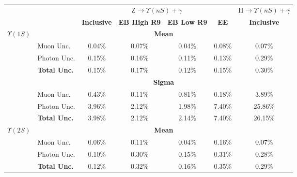 
\begin{tabular}{cl|c|c|c|c|c|}
\cline{3-7}
\multicolumn{1}{l}{}                      &      & \multicolumn{4}{c|}{Z$\rightarrow \Upsilon(nS) + \gamma$} & H$\rightarrow \Upsilon(nS) + \gamma$ \\ \cline{3-7}
\multicolumn{1}{l}{}                      &                     & \textbf{Inclusive}  & \textbf{EB High R9}  & \textbf{EB Low R9}  & \textbf{EE} & \textbf{Inclusive}        \\ \hline


\multicolumn{1}{|c|}{\multirow{8}{*}{$\Upsilon(1S)$}} & \multicolumn{6}{c|}{\textbf{Mean}} \\ \cline{2-7}
\multicolumn{1}{|c|}{}                    & Muon Unc.           & 0.04\% & 0.07\% & 0.04\% & 0.08\% & 0.07\% \\ \cline{2-7}
\multicolumn{1}{|c|}{}                    & Photon Unc.         & 0.15\% & 0.16\% & 0.11\% & 0.13\% & 0.29\% \\ \cline{2-7}
\multicolumn{1}{|c|}{}                    & \textbf{Total Unc.} & 0.15\% & 0.17\% & 0.12\% & 0.15\% & 0.30\% \\ \cline{2-7}


\multicolumn{1}{|c|}{}                    & \multicolumn{6}{c|}{\textbf{Sigma}}            \\ \cline{2-7}
\multicolumn{1}{|c|}{}                    & Muon Unc.           & 0.43\% & 0.11\% & 0.81\% & 0.18\% & 3.89\% \\ \cline{2-7}
\multicolumn{1}{|c|}{}                    & Photon Unc.         & 3.96\% & 2.12\% & 1.98\% & 7.40\% & 25.86\% \\ \cline{2-7}
\multicolumn{1}{|c|}{}                    & \textbf{Total Unc.} & 3.98\% & 2.12\% & 2.14\% & 7.40\% & 26.15\% \\ \hline \hline



\multicolumn{1}{|c|}{\multirow{8}{*}{$\Upsilon(2S)$}} & \multicolumn{6}{c|}{\textbf{Mean}} \\ \cline{2-7}
\multicolumn{1}{|c|}{}                    & Muon Unc.           & 0.06\% & 0.11\% & 0.04\% & 0.16\% & 0.07\% \\ \cline{2-7}
\multicolumn{1}{|c|}{}                    & Photon Unc.         & 0.10\% & 0.30\% & 0.15\% & 0.31\% & 0.28\% \\ \cline{2-7}
\multicolumn{1}{|c|}{}                    & \textbf{Total Unc.} & 0.12\% & 0.32\% & 0.16\% & 0.35\% & 0.29\% \\ \cline{2-7}



\end{tabular}
